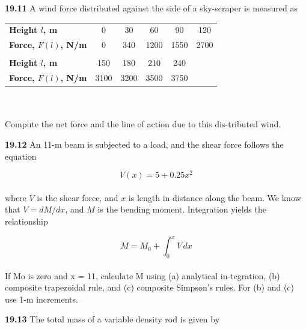 \documentclass[../main.tex]{subfiles}
\begin{document}
\begin{multicols}{2}
\textbf{19.11} A wind force distributed against the side of a sky-scraper is measured as\\
\begin{tabular}{lccccc}
	\hline
\scriptsize{\textbf{Height $l$, m}} & \scriptsize{0} & \scriptsize{30} & \scriptsize{60} & \scriptsize{90} & \scriptsize{120}\\
\scriptsize{\textbf{Force, $F(l)$, N/m}} & \scriptsize{0} & \scriptsize{340} & \scriptsize{1200} & \scriptsize{1550} & \scriptsize{2700}\\
\vspace{0in}\\
\scriptsize{\textbf{Height $l$, m}} & \scriptsize{150} & \scriptsize{180} & \scriptsize{210} & \scriptsize{240} & \vspace{0in} \\
\scriptsize{\textbf{Force, $F(l)$, N/m}} & \scriptsize{3100} & \scriptsize{3200} & \scriptsize{3500} & \scriptsize{3750} & \vspace{0in} \\ \hline
\end{tabular}\\
\vspace{0.1pt}\\
Compute the net force and the line of action due to this dis-tributed wind.


\textbf{19.12} An 11-m beam is subjected to a load, and the shear
force follows the equation

	$$V(x)=5+0.25x^2$$\\
where $V$ is the shear force, and $x$ is length in distance along
the beam. We know that $V = dM/dx$, and $M$ is the bending
moment. Integration yields the relationship

	$$M=M_{0}+\int^{x}_{0}V\,dx$$\\
If Mo is zero and x = 11, calculate M using (a) analytical in-tegration, (b) composite trapezoidal rule, and (c) composite
Simpson's rules. For (b) and (c) use 1-m increments.

\textbf{19.13} The total mass of a variable density rod is given by


\end{multicols}
\end{document}
